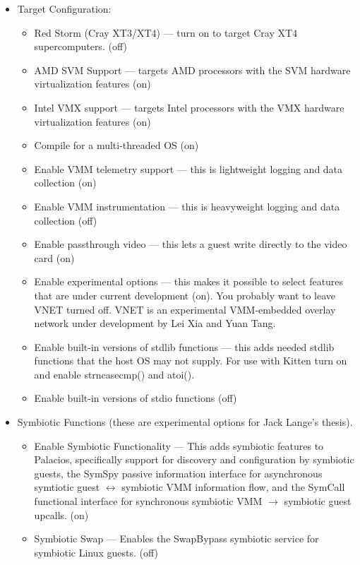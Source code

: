 \documentclass[11pt]{article}
\begin{document}
\begin{itemize}
\item Target Configuration:   
\begin{itemize}

\item Red Storm (Cray XT3/XT4) --- turn on to target Cray XT4
supercomputers.  (off)
\item AMD SVM Support --- targets AMD processors with the SVM hardware
virtualization features (on)
\item Intel VMX support --- targets Intel processors with the VMX
hardware virtualization features (on)
\item Compile for a multi-threaded OS (on)
\item Enable VMM telemetry support --- this is lightweight logging and
data collection (on)  
\item Enable VMM instrumentation --- this is heavyweight logging and
data collection (off)
\item Enable passthrough video --- this lets a guest write directly to
the video card (on)
\item Enable experimental options --- this makes it possible to select
features that are under current development (on).  You probably want
to leave VNET turned off.  VNET is an experimental VMM-embedded
overlay network under development by Lei Xia and Yuan Tang.
\item Enable built-in versions of stdlib functions --- this adds
needed stdlib functions that the host OS may not supply.  For use with
Kitten turn on and enable strncasecmp() and atoi().
\item Enable built-in versions of stdio functions (off)
\end{itemize}
\item Symbiotic Functions (these are experimental options for Jack
Lange's thesis). 
\begin{itemize}
\item Enable Symbiotic Functionality --- This adds symbiotic features
to Palacios, specifically support for discovery and configuration by
symbiotic guests, the SymSpy passive information interface for
asynchronous symtiotic guest $\leftrightarrow$ symbiotic VMM
information flow, and the SymCall functional interface for synchronous
symbiotic VMM $\rightarrow$ symbiotic guest upcalls.  (on)
\item Symbiotic Swap --- Enables the SwapBypass symbiotic service for
symbiotic Linux guests.  (off)
\end{itemize}

\end{itemize}
\end{document}
